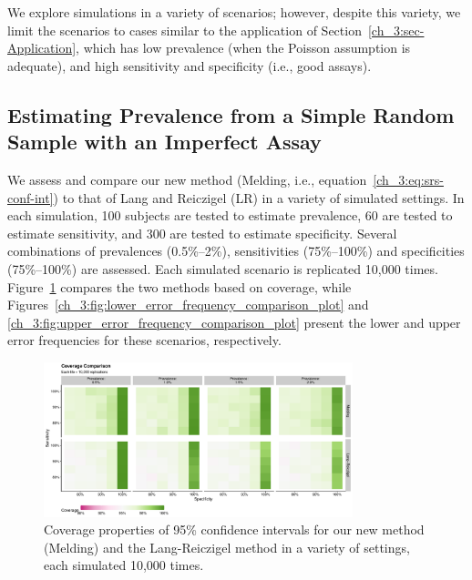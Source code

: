 We explore simulations in a variety of scenarios; however, despite this variety, we limit the scenarios to cases similar to the application of Section~\ref{ch_3:sec-Application}, which has low prevalence (when the Poisson assumption is adequate), and high
sensitivity and specificity (i.e., good assays).

\subsection{Estimating Prevalence from a Simple Random Sample with an Imperfect Assay}

We assess and compare our new method (Melding, i.e., equation~\ref{ch_3:eq:srs-conf-int}) to that of Lang and Reiczigel (LR) in a variety of simulated settings.
In each simulation, 100 subjects are tested to estimate prevalence, 60 are tested to estimate sensitivity, and 300 are tested to estimate specificity.
Several combinations of prevalences (0.5\%--2\%), sensitivities (75\%--100\%) and specificities (75\%--100\%) are assessed.
Each simulated scenario is replicated 10,000 times.
Figure~\ref{ch_3:fig:coverage_comparison_plot} compares the two methods based on coverage, while Figures~\ref{ch_3:fig:lower_error_frequency_comparison_plot} and \ref{ch_3:fig:upper_error_frequency_comparison_plot} present the lower and upper error frequencies for these scenarios, respectively.

\begin{figure}
    \centering
    \includegraphics[width=0.8\textwidth]{simple_coverage_comparison_plot}
    \caption{Coverage properties of 95\% confidence intervals for our new method (Melding) and the Lang-Reiczigel method in a variety of settings, each simulated 10,000 times.}
    \label{ch_3:fig:coverage_comparison_plot}
\end{figure}

